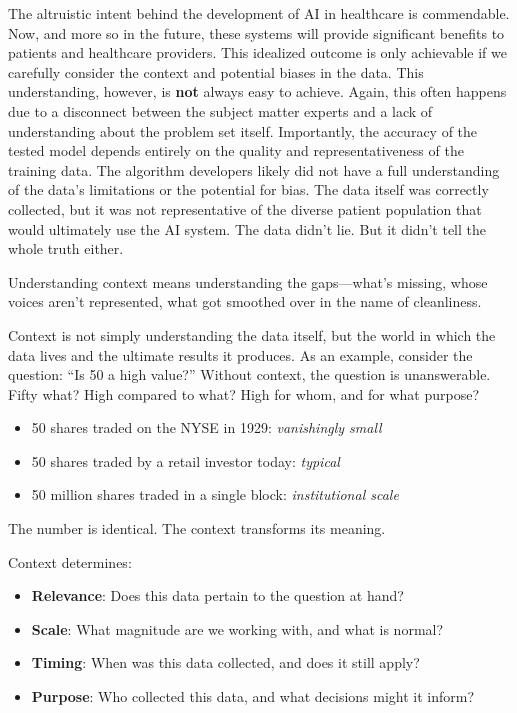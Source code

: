 The altruistic intent behind the development of AI in healthcare is commendable. Now, and more so in the future, these systems will provide significant benefits to patients and healthcare providers. 
This idealized outcome is only achievable if we carefully consider the context and potential biases in the data. This understanding, however, is \textbf{not} always easy to achieve.
Again, this often happens due to a disconnect between the subject matter experts and a lack of understanding about the problem set itself. 
Importantly, the accuracy of the tested model depends entirely on the quality and representativeness of the training data. 
The algorithm developers likely did not have a full understanding of the data's limitations or the potential for bias. The data itself was correctly collected, but it was not representative of the diverse patient population that would ultimately use the AI system.
The data didn't lie. But it didn't tell the whole truth either.

Understanding context means understanding the gaps---what's missing, 
whose voices aren't represented, what got smoothed over in the name 
of cleanliness. 

Context is not simply understanding the data itself, but the world in which the data lives and the ultimate results it produces. 
As an example, consider the question: ``Is 50 a high value?'' Without context, the question is unanswerable. Fifty what? High compared to what? High for whom, and for what purpose?

\begin{itemize}
    \item 50 shares traded on the NYSE in 1929: \textit{vanishingly small}
    \item 50 shares traded by a retail investor today: \textit{typical}
    \item 50 million shares traded in a single block: \textit{institutional scale}
\end{itemize}

The number is identical. The context transforms its meaning.

Context determines:
\begin{itemize}
    \item \textbf{Relevance}: Does this data pertain to the question at hand?
    \item \textbf{Scale}: What magnitude are we working with, and what is normal?
    \item \textbf{Timing}: When was this data collected, and does it still apply?
    \item \textbf{Purpose}: Who collected this data, and what decisions might it inform?
\end{itemize}

